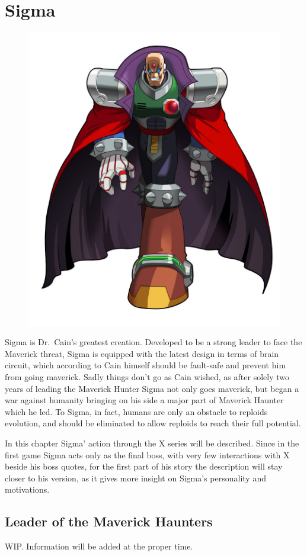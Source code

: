 \chapter{Sigma}\label{char:Sigma}
\begin{figure}[h]
	\centering
	\includegraphics[width=0.4\linewidth]{figures/X1/Sigma_stages/MHXSigma.jpg}
\end{figure}
Sigma is Dr.~Cain's greatest creation. Developed to be a strong leader to face the Maverick threat, Sigma is equipped with the latest design in terms of brain circuit, which according to Cain himself should be fault-safe and prevent him from going maverick. Sadly things don't go as Cain wished, as after solely two years of leading the Maverick Hunter Sigma not only goes maverick, but began a war against humanity bringing on his side a major part of Maverick Haunter which he led. To Sigma, in fact, humans are only an obstacle to reploids evolution, and should be eliminated to allow reploids to reach their full potential. 

In this chapter Sigma' action through the X series will be described. Since in the first game Sigma acts only as the final boss, with very few interactions with X beside his boss quotes, for the first part of his story the description will stay closer to his \mhx version, as it gives more insight on Sigma's personality and motivations.

\section{Leader of the Maverick Haunters}
WIP. Information will be added at the proper time.


